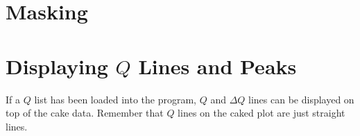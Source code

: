 \section{Masking}

\section{\texorpdfstring{Displaying $Q$ Lines and Peaks}{
    Displaying Q Lines and Peaks}}
    \label{cakeQlinesandpeaks}

If a $Q$ list has been loaded into the program, 
$Q$ and $\Delta Q$ lines can be displayed on top
of the cake data. Remember that $Q$ lines on the
caked plot are just straight lines. 

\begin{figure}
    \centering

\end{figure}
